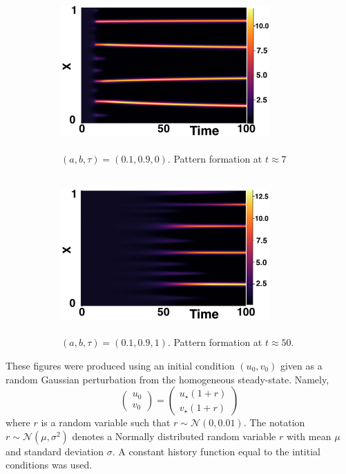 \documentclass[12pt]{report}
\begin{document}
\begin{figure}[H]
    \centering
    \begin{subfigure}[b]{0.45\textwidth}
        \centering
        \includegraphics[width=8cm,height = 6cm]{patt1.png}
        \caption{$(a,b,\tau)=(0.1,0.9,0)$. Pattern formation at $t\approx7$ }
        \label{}
    \end{subfigure}
    \hfill
    \begin{subfigure}[b]{0.45\textwidth}
        \centering
        \includegraphics[width=8cm,height = 6cm]{patt2.png}
        \caption{$(a,b,\tau)=(0.1,0.9,1)$. Pattern formation at $t\approx50$.}
        \label{}
    \end{subfigure}
    \caption{}
    \label{fig:fixedsim2}
\end{figure}
These figures were produced using an initial condition $(u_0,v_0)$ given as a random Gaussian perturbation from the homogeneous steady-state. Namely, $$\begin{pmatrix}u_0\\v_0\end{pmatrix}=\begin{pmatrix}u_\star(1+r)\\v_\star(1+r)\end{pmatrix}$$ where $r$ is a random variable such that $r\sim\mathcal{N}(0,0.01)$. The notation $r\sim\mathcal{N}(\mu,\sigma^2)$ denotes a Normally distributed random variable $r$ with mean $\mu$ and standard deviation $\sigma$. A constant history function equal to the intitial conditions was used.
\end{document}
